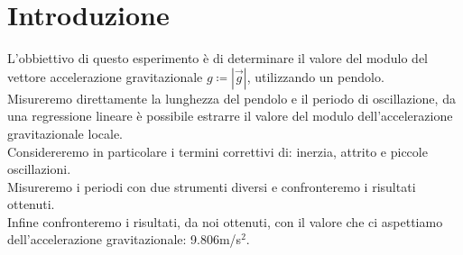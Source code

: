 \section{Introduzione}
L'obbiettivo di questo esperimento è di determinare il valore del modulo del vettore accelerazione gravitazionale $g \coloneq |\Vec{g}|$, utilizzando un pendolo.\\
Misureremo direttamente la lunghezza del pendolo e il periodo di oscillazione, da una regressione lineare è possibile estrarre il valore del modulo dell'accelerazione gravitazionale locale.\\

Considereremo in particolare i termini correttivi di: inerzia, attrito e piccole oscillazioni.\\

Misureremo i periodi con due strumenti diversi e confronteremo i risultati ottenuti.\\

Infine confronteremo i risultati, da noi ottenuti, con il valore che ci aspettiamo dell'accelerazione gravitazionale: 9.806m/s$^2$.
